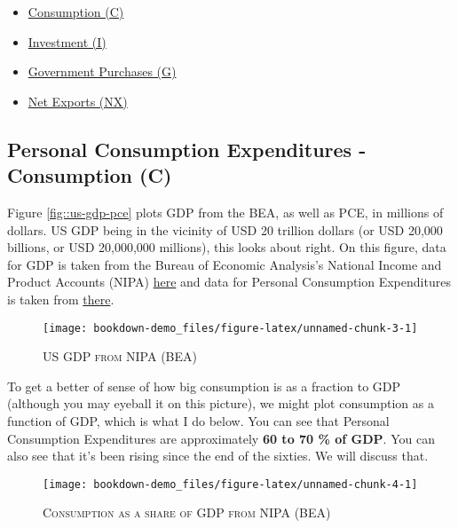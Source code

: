 \documentclass[]{book}
\providecommand{\tightlist}{%
  \setlength{\itemsep}{0pt}\setlength{\parskip}{0pt}}
\theoremstyle{definition}
\theoremstyle{definition}
\theoremstyle{definition}
\theoremstyle{remark}
\begin{document}
\begin{itemize}
\tightlist
\item
  \protect\hyperlink{cons}{Consumption (C)}
\item
  \protect\hyperlink{inv}{Investment (I)}
\item
  \protect\hyperlink{gov}{Government Purchases (G)}
\item
  \protect\hyperlink{net-exports}{Net Exports (NX)}
\end{itemize}

\hypertarget{cons}{\subsection{Personal Consumption Expenditures -
Consumption (C)}\label{cons}}

Figure \ref{fig::us-gdp-pce} plots GDP from the BEA, as well as PCE, in
millions of dollars. US GDP being in the vicinity of USD 20 trillion
dollars (or USD 20,000 billions, or USD 20,000,000 millions), this looks
about right. On this figure, data for GDP is taken from the Bureau of
Economic Analysis's National Income and Product Accounts (NIPA)
\href{https://db.nomics.world/BEA/NIPA-T10105/A191RC-Q}{here} and data
for Personal Consumption Expenditures is taken from
\href{https://db.nomics.world/BEA/NIPA-T10105/DPCERC-Q}{there}.

\begin{figure}

{\centering \texttt{[image: bookdown-demo\_files/figure-latex/unnamed-chunk-3-1]} 

}

\caption{\label{fig::us-gdp-pce}\textsc{US GDP from NIPA (BEA)}}\label{fig:unnamed-chunk-3}
\end{figure}

To get a better of sense of how big consumption is as a fraction to GDP
(although you may eyeball it on this picture), we might plot consumption
as a function of GDP, which is what I do below. You can see that
Personal Consumption Expenditures are approximately \textbf{60 to 70 \%
of GDP}. You can also see that it's been rising since the end of the
sixties. We will discuss that.

\begin{figure}

{\centering \texttt{[image: bookdown-demo\_files/figure-latex/unnamed-chunk-4-1]} 

}

\caption{\label{fig::us-gdp}\textsc{Consumption as a share of GDP from NIPA (BEA)}}\label{fig:unnamed-chunk-4}
\end{figure}
\end{document}
